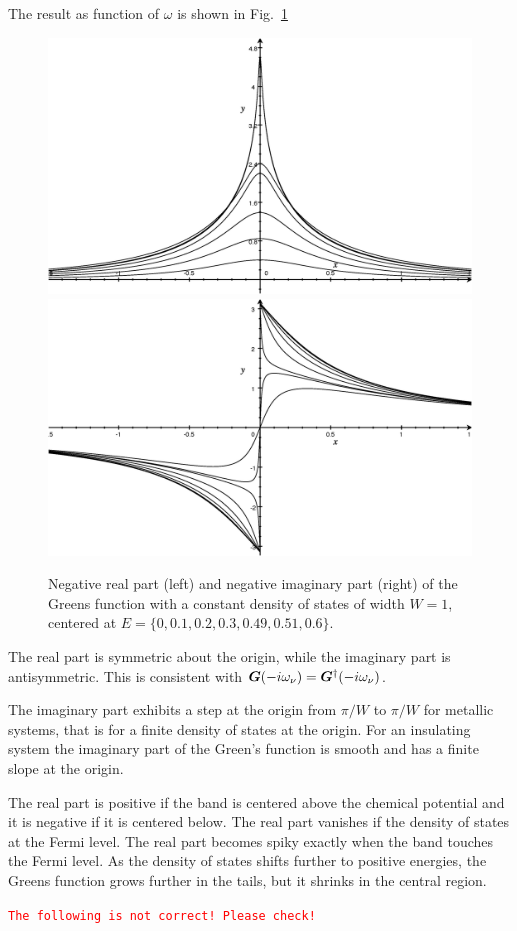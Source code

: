 \documentclass[11pt,a4paper]{report}
\newcommand{\petertt}[1]{\textcolor{red}{\texttt{#1}}}
\begin{document}
The result as function of $\omega$ is shown in Fig.~\ref{fig:modelgreen}
\begin{figure}[h!]
\begin{center}
\includegraphics[width=0.48\linewidth]{Figs/Grapher/ModelGreen/reg.eps}
\includegraphics[width=0.48\linewidth]{Figs/Grapher/ModelGreen/img.eps}
\end{center}
\caption{\label{fig:modelgreen}Negative real part (left) and negative imaginary
  part (right) of the Greens function with a constant density of
  states of width $W=1$, centered at
  $E=\{0,0.1,0.2,0.3,0.49,0.51,0.6\}$.}
\end{figure}
The real part is symmetric about
the origin, while the imaginary part is antisymmetric. This is
consistent with $\bm{G}(-i\omega_\nu)=\bm{G}^\dagger(-i\omega_\nu)$.

The imaginary part exhibits a
step at the origin from $\pi/W$ to $\pi/W$ for metallic systems, that is
for a finite density of states at the origin.  For an insulating
system the imaginary part of the Green's function is smooth and has a
finite slope at the origin. 

The real part is positive if the band is
centered above the chemical potential and it is negative if it is
centered below. The real part vanishes if the density of states at the
Fermi level. The real part becomes spiky exactly when the band
touches the Fermi level. As the density of states shifts further to
positive energies, the Greens function grows further in the tails, but
it shrinks in the central region.


\petertt{The following is not correct! Please check!}
\end{document}
